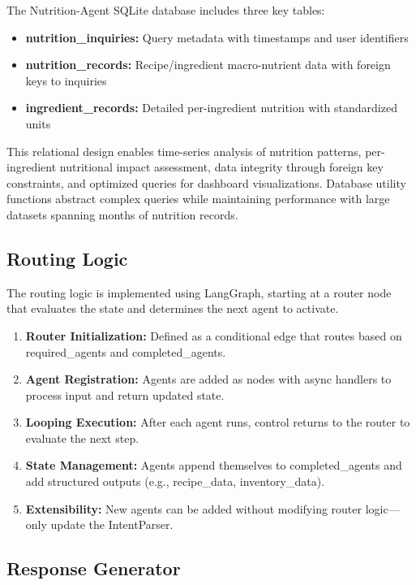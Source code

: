 \documentclass{ecai}
\begin{document}
The Nutrition-Agent SQLite database includes three key tables:
\begin{itemize}[noitemsep,topsep=0pt]
    \item \textbf{nutrition\_inquiries:} Query metadata with timestamps and user identifiers
    \item \textbf{nutrition\_records:} Recipe/ingredient macro-nutrient data with foreign keys to inquiries
    \item \textbf{ingredient\_records:} Detailed per-ingredient nutrition with standardized units
\end{itemize}

This relational design enables time-series analysis of nutrition patterns, per-ingredient nutritional impact assessment, data integrity through foreign key constraints, and optimized queries for dashboard visualizations. Database utility functions abstract complex queries while maintaining performance with large datasets spanning months of nutrition records.

\subsection{Routing Logic}

The routing logic is implemented using LangGraph, starting at a router node that evaluates the state and determines the next agent to activate.
\begin{enumerate}[noitemsep,topsep=0pt]
    \item \textbf{Router Initialization:} Defined as a conditional edge that routes based on required\_agents and completed\_agents.
    \item \textbf{Agent Registration:} Agents are added as nodes with async handlers to process input and return updated state.
    \item \textbf{Looping Execution:} After each agent runs, control returns to the router to evaluate the next step.
    \item \textbf{State Management:} Agents append themselves to completed\_agents and add structured outputs (e.g., recipe\_data, inventory\_data).
    \item \textbf{Extensibility:} New agents can be added without modifying router logic—only update the IntentParser.
\end{enumerate}

\subsection{Response Generator}
\end{document}
